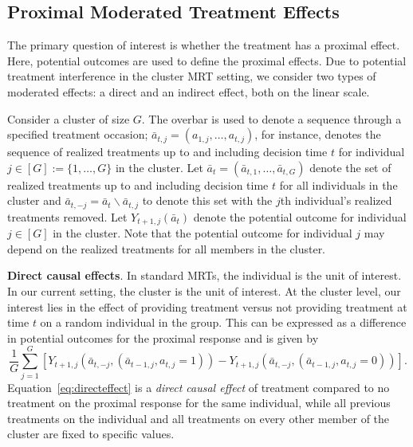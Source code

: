 \documentclass[12pt]{article}
\newcommand{\zw}[1]{\textcolor{blue}{[\textit{ZW: #1}]}}
\begin{document}
\subsection{Proximal Moderated Treatment Effects}
\label{section:prox_effects_pot_outcome}

The primary question of interest is whether the treatment has a proximal effect. Here, potential outcomes are used to define the proximal effects. Due to potential treatment interference in the cluster MRT setting, we consider two types of moderated effects: a direct and an indirect effect, both on the linear scale.

Consider a cluster of size $G$.  The overbar is used to denote a sequence through a specified treatment occasion; $\bar a_{t,j} = (a_{1,j},\ldots, a_{t,j})$, for instance, denotes the sequence of realized treatments up to and including decision time $t$ for individual $j \in [G]:=\{1,\ldots, G\}$ in the cluster.   Let $\bar a_{t} = (\bar a_{t,1}, \ldots, \bar a_{t,G})$ denote the set of realized treatments up to and including decision time $t$ for all individuals in the cluster and $\bar a_{t,-j} = \bar a_t \backslash \bar a_{t,j}$ to denote this set with the $j$th individual's realized treatments removed. Let $Y_{t+1,j} (\bar a_{t})$ denote the potential outcome for individual $j \in [G]$ in the cluster.  Note that the potential outcome for individual $j$ may depend on the realized treatments for all members in the cluster.

\noindent \textbf{Direct causal effects}.
In standard MRTs, the individual is the unit of interest.  In our current setting, the cluster is the unit of interest.  At the cluster level, our interest lies in the effect of providing treatment versus not providing treatment at time $t$ on a random individual in the group.  This can be expressed as a difference in potential outcomes for the proximal response and is given by
\begin{equation}
\label{eq:directeffect}
\frac{1}{G} \sum_{j=1}^G \left[ Y_{t+1,j} (\bar a_{t,-j}, (\bar a_{t-1,j}, a_{t,j}=1)) - Y_{t+1,j} (\bar a_{t,-j}, (\bar a_{t-1,j}, a_{t,j}=0)) \right].
\end{equation}
Equation~\eqref{eq:directeffect} is a \emph{direct causal effect} of treatment compared to no treatment on the proximal response for the same individual, while all previous treatments on the individual and all treatments on every other member of the cluster are fixed to specific values.
\end{document}
